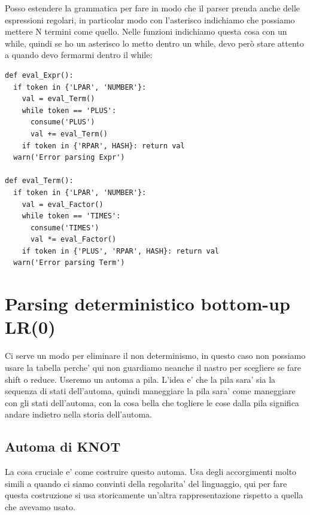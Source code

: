 Posso estendere la grammatica per fare in modo che il parser prenda anche delle espressioni regolari, in particolar modo con l'asterisco indichiamo che possiamo mettere N termini come quello. Nelle funzioni indichiamo questa cosa con un while, quindi se ho un asterisco lo metto dentro un while, devo però stare attento a quando devo fermarmi dentro il while:

\begin{lstlisting}
def eval_Expr():
  if token in {'LPAR', 'NUMBER'}:
    val = eval_Term()
    while token == 'PLUS':
      consume('PLUS')
      val += eval_Term()
    if token in {'RPAR', HASH}: return val
  warn('Error parsing Expr')

def eval_Term():
  if token in {'LPAR', 'NUMBER'}:
    val = eval_Factor()
    while token == 'TIMES':
      consume('TIMES')
      val *= eval_Factor()
    if token in {'PLUS', 'RPAR', HASH}: return val  
  warn('Error parsing Term')
\end{lstlisting}

\section{Parsing deterministico bottom-up LR(0)}

Ci serve un modo per eliminare il non determinismo, in questo caso non possiamo usare la tabella perche' qui non guardiamo neanche il nastro per scegliere se fare shift o reduce. Useremo un automa a pila.
L'idea e' che la pila sara' sia la sequenza di stati dell'automa, quindi maneggiare la pila sara' come maneggiare con gli stati dell'automa, con la cosa bella che togliere le cose dalla pila significa andare indietro nella storia dell'automa.

\subsection{Automa di KNOT}
La cosa cruciale e' come costruire questo automa. Usa degli accorgimenti molto simili a quando ci siamo convinti della regolarita' del linguaggio, qui per fare questa costruzione si usa storicamente un'altra rappresentazione rispetto a quella che avevamo usato.


